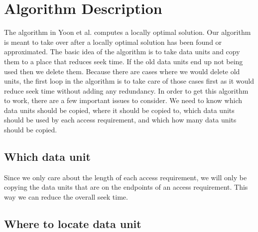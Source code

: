 \documentclass[11pt,psfig]{article}
\begin{document}
\section*{Algorithm Description}

The algorithm in Yoon et al. computes a locally optimal solution. Our algorithm is meant to take over after a locally optimal solution has been found or approximated. The basic idea of the algorithm is to take data units and copy them to a place that reduces seek time. If the old data units end up not being used then we delete them. Because there are cases where we would delete old units, the first loop in the algorithm is to take care of those cases first as it would reduce seek time without adding any redundancy. In order to get this algorithm to work, there are a few important issues to consider. We need to know which data units should be copied, where it should be copied to, which data units should be used by each access requirement, and which how many data units should be copied. 

\subsection*{Which data unit}

Since we only care about the length of each access requirement, we will only be copying the data units that are on the endpoints of an access requirement. This way we can reduce the overall seek time.

\subsection*{Where to locate data unit}
\end{document}

